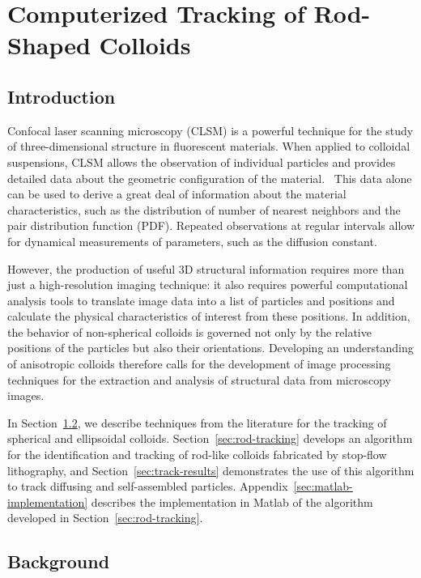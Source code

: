 \chapter{Computerized Tracking of Rod-Shaped Colloids}
\label{ch:comp-tracking}

\section{Introduction}

Confocal laser scanning microscopy (CLSM) is a powerful technique for the study of three-dimensional
structure in fluorescent materials. When applied to colloidal suspensions, CLSM allows the observation
of individual particles and provides detailed data about the geometric configuration of the 
material.~\cite{weitz-confocal}
This data alone can be used to derive a great deal
of information about the material
characteristics, such as the distribution of number of nearest neighbors and
the pair distribution function (PDF). Repeated observations at regular intervals allow for dynamical
measurements of parameters, such as the diffusion constant.~\cite{weitz-confocal,crocker-grier-spheres}

However, 
the production of useful 3D structural information requires more than just a 
high-resolution imaging technique: it also
requires powerful computational analysis tools to translate image data into a list of particles and positions and
calculate the physical characteristics of interest
from these positions.  In addition, the behavior of non-spherical colloids
is governed not only by the relative positions of the particles but also their orientations. Developing an
understanding of anisotropic colloids
therefore calls for the development of image processing techniques for the extraction and analysis of
structural data from microscopy images.

In Section~\ref{sec:track-background}, we describe techniques from the literature for the tracking of 
spherical and ellipsoidal colloids.  Section~\ref{sec:rod-tracking} develops an algorithm for the identification
and tracking of rod-like colloids fabricated by stop-flow lithography, and Section~\ref{sec:track-results}
demonstrates the use of this algorithm to track diffusing and self-assembled particles.
Appendix~\ref{sec:matlab-implementation} describes the implementation in Matlab of the algorithm developed in 
Section~\ref{sec:rod-tracking}.

\section{Background}
\label{sec:track-background}

